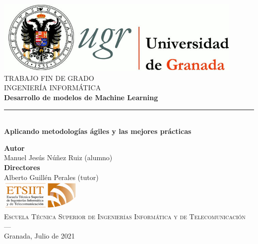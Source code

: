 \begin{titlepage}
 
 
\newlength{\centeroffset}
\setlength{\centeroffset}{-0.5\oddsidemargin}
\addtolength{\centeroffset}{0.5\evensidemargin}
\thispagestyle{empty}

\noindent\hspace*{\centeroffset}\begin{minipage}{\textwidth}

\centering
\includegraphics[width=0.9\textwidth]{imagenes/logo_ugr.jpg}\\[1.4cm]

\textsc{ \Large TRABAJO FIN DE GRADO\\[0.2cm]}
\textsc{ INGENIERÍA INFORMÁTICA}\\[1cm]
% 
{\Huge\bfseries Desarrollo de modelos de Machine Learning\\
}
\noindent\rule[-1ex]{\textwidth}{3pt}\\[3.5ex]
{\large\bfseries Aplicando metodologías ágiles y las mejores prácticas}
\end{minipage}

\vspace{2.5cm}
\noindent\hspace*{\centeroffset}\begin{minipage}{\textwidth}
\centering

\textbf{Autor}\\ {Manuel Jesús Núñez Ruiz (alumno)}\\[2.5ex]
\textbf{Directores}\\
{Alberto Guillén Perales (tutor)}\\[2cm]
\includegraphics[width=0.3\textwidth]{imagenes/etsiit_logo.png}\\[0.1cm]
\textsc{Escuela Técnica Superior de Ingenierías Informática y de Telecomunicación}\\
\textsc{---}\\
Granada, Julio de 2021
\end{minipage}
\end{titlepage}


